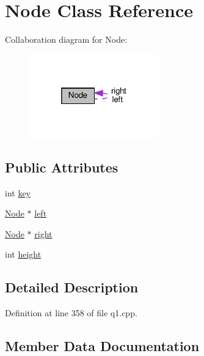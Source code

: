 \hypertarget{class_node}{}\section{Node Class Reference}
\label{class_node}


Collaboration diagram for Node\+:
\nopagebreak
\begin{figure}[H]
\begin{center}
\leavevmode
\includegraphics[width=160pt]{class_node__coll__graph}
\end{center}
\end{figure}
\subsection*{Public Attributes}
\begin{DoxyCompactItemize}
\item 
int \hyperlink{class_node_a3020957813f200a9da836428aad2d8d7}{key}
\item 
\hyperlink{class_node}{Node} $\ast$ \hyperlink{class_node_ab8c667ac8fdb120ed4c031682a9cdaee}{left}
\item 
\hyperlink{class_node}{Node} $\ast$ \hyperlink{class_node_a7328862eaa6dea28018326549b3294d3}{right}
\item 
int \hyperlink{class_node_a61966b207f0584aaa4773e5e1266e905}{height}
\end{DoxyCompactItemize}


\subsection{Detailed Description}


Definition at line 358 of file q1.\+cpp.



\subsection{Member Data Documentation}
\mbox{\label{class_node_a61966b207f0584aaa4773e5e1266e905}} 
